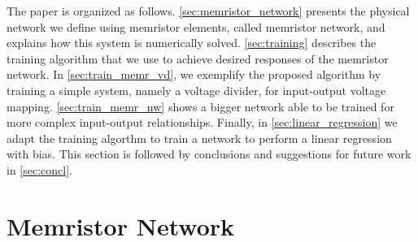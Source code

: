 \documentclass[reprint,superscriptaddress,prb,showkeys]{revtex4-2}
\begin{document}


The paper is organized as follows. \cref{sec:memristor_network} presents the physical network we define using memristor elements, called memristor network, and explains how this system is numerically solved. \cref{sec:training} describes the training algorithm that we use to achieve desired responses of the memristor network. In \cref{sec:train_memr_vd}, we exemplify the proposed algorithm by training a simple system, namely a voltage divider, for input-output voltage mapping. \cref{sec:train_memr_nw} shows a bigger network able to be trained for more complex input-output relationships. Finally, in \cref{sec:linear_regression} we adapt the training algorthm to train a network to perform a linear regression with bias. This section is followed by conclusions and suggestions for future work in \cref{sec:concl}.

\newpage

\section{\label{sec:memristor_network}Memristor Network}
\end{document}
